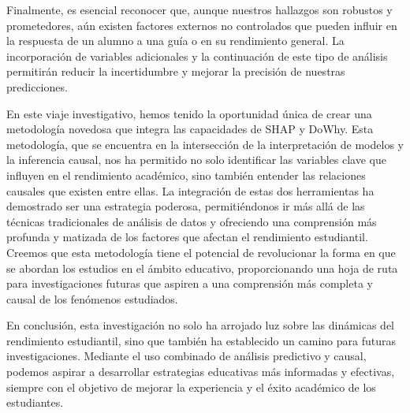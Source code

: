 Finalmente, es esencial reconocer que, aunque nuestros hallazgos son robustos y prometedores, aún existen factores externos no controlados que pueden influir en la respuesta de un alumno a una guía o en su rendimiento general. La incorporación de variables adicionales y la continuación de este tipo de análisis permitirán reducir la incertidumbre y mejorar la precisión de nuestras predicciones.

En este viaje investigativo, hemos tenido la oportunidad única de crear una metodología novedosa que integra las capacidades de SHAP y DoWhy. Esta metodología, que se encuentra en la intersección de la interpretación de modelos y la inferencia causal, nos ha permitido no solo identificar las variables clave que influyen en el rendimiento académico, sino también entender las relaciones causales que existen entre ellas. La integración de estas dos herramientas ha demostrado ser una estrategia poderosa, permitiéndonos ir más allá de las técnicas tradicionales de análisis de datos y ofreciendo una comprensión más profunda y matizada de los factores que afectan el rendimiento estudiantil. Creemos que esta metodología tiene el potencial de revolucionar la forma en que se abordan los estudios en el ámbito educativo, proporcionando una hoja de ruta para investigaciones futuras que aspiren a una comprensión más completa y causal de los fenómenos estudiados.

En conclusión, esta investigación no solo ha arrojado luz sobre las dinámicas del rendimiento estudiantil, sino que también ha establecido un camino para futuras investigaciones. Mediante el uso combinado de análisis predictivo y causal, podemos aspirar a desarrollar estrategias educativas más informadas y efectivas, siempre con el objetivo de mejorar la experiencia y el éxito académico de los estudiantes.
